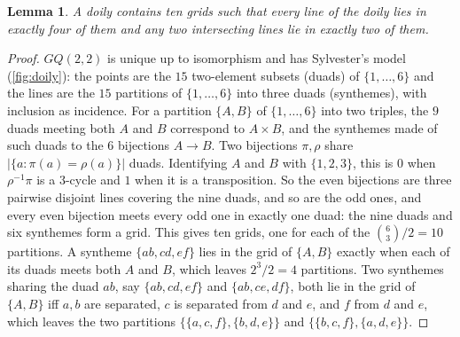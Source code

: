\documentclass[11pt]{article}
\newtheorem{lemma}[lemma]{Lemma}
\theoremstyle{definition}
\theoremstyle{remark}
\begin{document}
\begin{lemma}\label{lem:sylvester}
A doily contains ten grids such that every line of the doily lies in exactly four of them and any two intersecting lines lie in exactly two of them.
\end{lemma}
\begin{proof}
$GQ(2,2)$ is unique up to isomorphism and has Sylvester's model~\cite{PayneThas09} (\cref{fig:doily}): the points are the $15$ two-element subsets (duads) of $\{1,\dots,6\}$ and the lines are the $15$ partitions of $\{1,\dots,6\}$ into three duads (synthemes), with inclusion as incidence.
For a partition $\{A,B\}$ of $\{1,\dots,6\}$ into two triples, the $9$ duads meeting both $A$ and $B$ correspond to $A\times B$, and the synthemes made of such duads to the $6$ bijections $A\to B$.
Two bijections $\pi,\rho$ share $|\{a:\pi(a)=\rho(a)\}|$ duads. Identifying $A$ and $B$ with $\{1,2,3\}$, this is $0$ when $\rho^{-1}\pi$ is a $3$-cycle and $1$ when it is a transposition.
So the even bijections are three pairwise disjoint lines covering the nine duads, and so are the odd ones, and every even bijection meets every odd one in exactly one duad: the nine duads and six synthemes form a grid.
This gives ten grids, one for each of the $\binom63/2=10$ partitions.
A syntheme $\{ab,cd,ef\}$ lies in the grid of $\{A,B\}$ exactly when each of its duads meets both $A$ and $B$, which leaves $2^3/2=4$ partitions.
Two synthemes sharing the duad $ab$, say $\{ab,cd,ef\}$ and $\{ab,ce,df\}$, both lie in the grid of $\{A,B\}$ iff $a,b$ are separated, $c$ is separated from $d$ and $e$, and $f$ from $d$ and $e$, which leaves the two partitions $\{\{a,c,f\},\{b,d,e\}\}$ and $\{\{b,c,f\},\{a,d,e\}\}$.
\end{proof}
\end{document}
